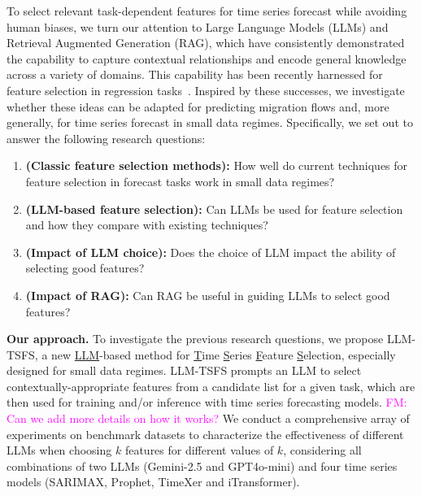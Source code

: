 \documentclass[conference]{IEEEtran}
\newcommand{\fm}[1]{\textcolor{magenta}{FM: #1}}
\newcommand{\method}{{LLM-TSFS}}
\begin{document}
To select relevant task-dependent features for time series forecast while avoiding human biases, we turn our attention to Large Language Models (LLMs) and Retrieval Augmented Generation (RAG), which have consistently demonstrated the capability to capture contextual relationships and encode general knowledge across a variety of domains. This capability has been recently harnessed for feature selection in regression tasks~\cite{hegselmann2023tabllm, li_exploring_2025}. Inspired by these successes, we investigate whether these ideas can be adapted for predicting migration flows and, more generally, for time series forecast in small data regimes. Specifically, we set out to answer the following research questions:
\begin{enumerate}[label=\textbf{RQ\arabic*}]
    \item \textbf{(Classic feature selection methods):} How well do current techniques for feature selection in forecast tasks work in small data regimes?
    \item \textbf{(LLM-based feature selection):} Can LLMs be used for feature selection and how they compare with existing techniques?
    \item \textbf{(Impact of LLM choice):} Does the choice of LLM impact the ability of selecting good features?
    \item \textbf{(Impact of RAG):} Can RAG be useful in guiding LLMs to select good features?
\end{enumerate}

\noindent \textbf{Our approach.} To investigate the previous research questions, we propose \method{}, a new \underline{LLM}-based method for \underline{T}ime \underline{S}eries \underline{F}eature \underline{S}election, especially designed for small data regimes. \method{} prompts an LLM to select contextually-appropriate features from a candidate list for a given task, which are then used for training and/or inference with time series forecasting models. \fm{Can we add more details on how it works?} We conduct a comprehensive array of experiments on benchmark datasets to characterize the effectiveness of different LLMs when choosing $k$ features for different values of $k$, considering all combinations of two LLMs (Gemini-2.5 and GPT4o-mini) and four time series models (SARIMAX, Prophet, TimeXer and iTransformer).
\end{document}
